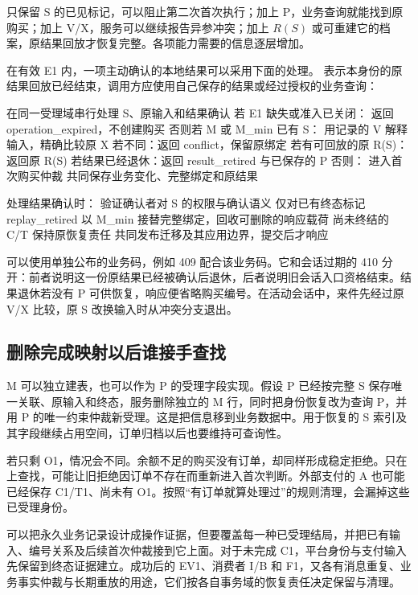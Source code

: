 只保留 S 的已见标记，可以阻止第二次首次执行；加上 P，业务查询就能找到原购买；加上 V/X，服务可以继续报告异参冲突；加上 $R(S)$ 或可重建它的档案，原结果回放才恢复完整。各项能力需要的信息逐层增加。


在有效 E1 内，一项主动确认的本地结果可以采用下面的处理。 表示本身份的原结果回放已经结束，调用方应使用自己保存的结果或经过授权的业务查询：

\begin{BookCode}
在同一受理域串行处理 S、原输入和结果确认
若 E1 缺失或准入已关闭：
    返回 operation_expired，不创建购买
否则若 M 或 M_min 已有 S：
    用记录的 V 解释输入，精确比较原 X
    若不同：返回 conflict，保留原绑定
    若有可回放的原 R(S)：返回原 R(S)
    若结果已经退休：返回 result_retired 与已保存的 P
否则：
    进入首次购买仲裁
    共同保存业务变化、完整绑定和原结果

处理结果确认时：
    验证确认者对 S 的权限与确认语义
    仅对已有终态标记 replay_retired
    以 M_min 接替完整绑定，回收可删除的响应载荷
    尚未终结的 C/T 保持原恢复责任
共同发布迁移及其应用边界，提交后才响应
\end{BookCode}

 可以使用单独公布的业务码，例如 409 配合该业务码。它和会话过期的 410 分开：前者说明这一份原结果已经被确认后退休，后者说明旧会话入口资格结束。结果退休若没有 P 可供恢复，响应便省略购买编号。在活动会话中，来件先经过原 V/X 比较，原 S 改换输入时从冲突分支退出。

\subsection*{删除完成映射以后谁接手查找}

M 可以独立建表，也可以作为 P 的受理字段实现。假设 P 已经按完整 S 保存唯一关联、原输入和终态，服务删除独立的 M 行，同时把身份恢复改为查询 P，并用 P 的唯一约束仲裁新受理。这是把信息移到业务数据中。用于恢复的 S 索引及其字段继续占用空间，订单归档以后也要维持可查询性。

若只剩 O1，情况会不同。余额不足的购买没有订单，却同样形成稳定拒绝。只在  上查找，可能让旧拒绝因订单不存在而重新进入首次判断。外部支付的 A 也可能已经保存 C1/T1、尚未有 O1。按照“有订单就算处理过”的规则清理，会漏掉这些已受理身份。

可以把永久业务记录设计成操作证据，但要覆盖每一种已受理结局，并把已有输入、编号关系及后续首次仲裁接到它上面。对于未完成 C1，平台身份与支付输入先保留到终态证据建立。成功后的 EV1、消费者 I/B 和 F1，又各有消息重复、业务事实仲裁与长期重放的用途，它们按各自事务域的恢复责任决定保留与清理。

